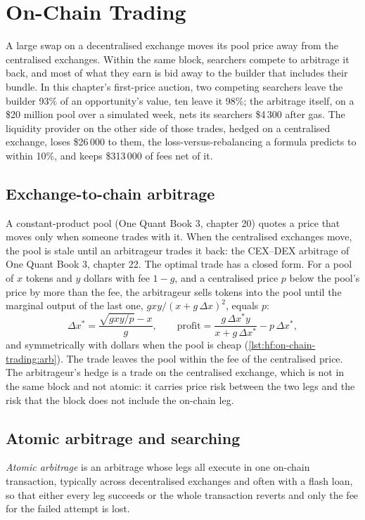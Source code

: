 \chapter{On-Chain Trading}\label{ch:hf:on-chain-trading}

A large swap on a decentralised exchange moves its pool price away from the centralised exchanges. Within the same block, searchers compete to
arbitrage it back, and most of what they earn is bid away to the builder that includes their bundle. In this chapter's first-price auction, two
competing searchers leave the builder 93\% of an opportunity's value, ten leave it 98\%; the arbitrage itself, on a \$20 million pool over a
simulated week, nets its searchers \$4\,300 after gas. The liquidity provider on the other side of those trades, hedged on a centralised exchange,
loses \$26\,000 to them, the loss-versus-rebalancing a formula predicts to within 10\%, and keeps \$313\,000 of fees net of it.

\section{Exchange-to-chain arbitrage}

A constant-product pool (One Quant Book 3, chapter 20) quotes a price that moves only when someone trades with it. When the centralised
exchanges move, the pool is stale until an arbitrageur trades it back: the CEX--DEX arbitrage of One Quant Book 3, chapter 22. The optimal trade
has a closed form. For a pool of $x$ tokens and $y$ dollars with fee $1-g$, and a centralised price $p$ below the pool's price by more than the fee,
the arbitrageur sells tokens into the pool until the marginal output of the last one, $gxy/(x+g\,\Delta x)^2$, equals $p$:
\[
\Delta x^\ast=\frac{\sqrt{gxy/p}-x}{g},\qquad\text{profit}=\frac{g\,\Delta x^\ast y}{x+g\,\Delta x^\ast}-p\,\Delta x^\ast,
\]
and symmetrically with dollars when the pool is cheap (\cref{lst:hf:on-chain-trading:arb}). The trade leaves the pool within the fee of the
centralised price. The arbitrageur's hedge is a trade on the centralised exchange, which is not in the same block and not atomic: it carries price
risk between the two legs and the risk that the block does not include the on-chain leg.

\section{Atomic arbitrage and searching}

\begin{definition}\label{def:hf:on-chain-trading:atomic}
\emph{Atomic arbitrage} is an arbitrage whose legs all execute in one on-chain transaction, typically across decentralised
exchanges and often with a flash loan, so that either every leg succeeds or the whole transaction reverts and only the fee for the failed
attempt is lost.
\end{definition}

